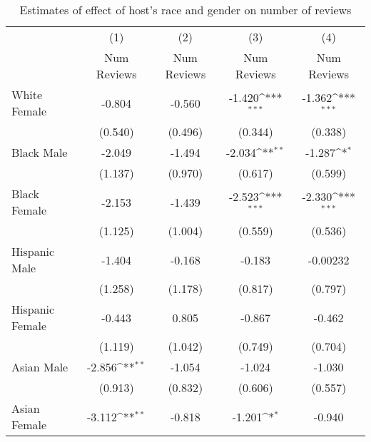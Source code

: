 {
\def\sym#1{\ifmmode^{#1}\else\(^{#1}\)\fi}
\begin{longtable}{l*{4}{c}}
\caption{Estimates of effect of host's race and gender on number of reviews}\\
\hline\hline\endfirsthead\hline\endhead\hline\endfoot\endlastfoot
                    &\multicolumn{1}{c}{(1)}&\multicolumn{1}{c}{(2)}&\multicolumn{1}{c}{(3)}&\multicolumn{1}{c}{(4)}\\
                    &\multicolumn{1}{c}{Num Reviews}&\multicolumn{1}{c}{Num Reviews}&\multicolumn{1}{c}{Num Reviews}&\multicolumn{1}{c}{Num Reviews}\\
\hline
White Female        &      -0.804         &      -0.560         &      -1.420\sym{***}&      -1.362\sym{***}\\
                    &     (0.540)         &     (0.496)         &     (0.344)         &     (0.338)         \\
[1em]
Black Male          &      -2.049         &      -1.494         &      -2.034\sym{**} &      -1.287\sym{*}  \\
                    &     (1.137)         &     (0.970)         &     (0.617)         &     (0.599)         \\
[1em]
Black Female        &      -2.153         &      -1.439         &      -2.523\sym{***}&      -2.330\sym{***}\\
                    &     (1.125)         &     (1.004)         &     (0.559)         &     (0.536)         \\
[1em]
Hispanic Male       &      -1.404         &      -0.168         &      -0.183         &    -0.00232         \\
                    &     (1.258)         &     (1.178)         &     (0.817)         &     (0.797)         \\
[1em]
Hispanic Female     &      -0.443         &       0.805         &      -0.867         &      -0.462         \\
                    &     (1.119)         &     (1.042)         &     (0.749)         &     (0.704)         \\
[1em]
Asian Male          &      -2.856\sym{**} &      -1.054         &      -1.024         &      -1.030         \\
                    &     (0.913)         &     (0.832)         &     (0.606)         &     (0.557)         \\
[1em]
Asian Female        &      -3.112\sym{**} &      -0.818         &      -1.201\sym{*}  &      -0.940         \\

\end{longtable}}

